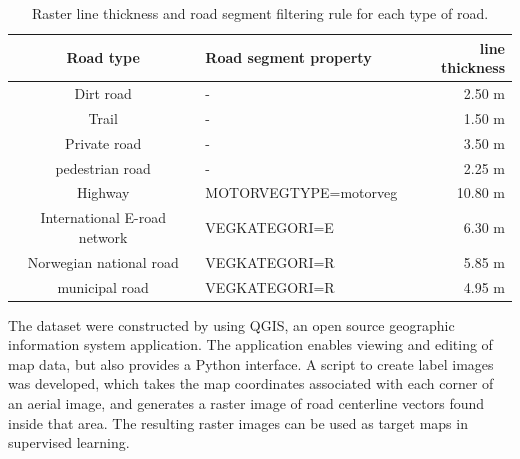 \begin{table}[htp]
\caption{Raster line thickness and road segment filtering rule for each type of road. }
\begin{center}
\begin{adjustbox}{max width=\textwidth}
\begin{tabular}{|c|l|r|}\hline
 		 Road type & Road segment property & line thickness\\\hline
 		 Dirt road & - & 2.50 m\\\hline
 		 Trail & - & 1.50 m\\\hline
 		 Private road & - & 3.50 m\\\hline
 		 pedestrian road & - & 2.25 m\\\hline
 		 Highway & MOTORVEGTYPE=motorveg & 10.80 m\\\hline
 		 International E-road network & VEGKATEGORI=E & 6.30 m\\\hline
 		 Norwegian national road & VEGKATEGORI=R & 5.85 m\\\hline
 		 municipal road & VEGKATEGORI=R & 4.95 m\\\hline
\end{tabular}
\end{adjustbox}
\end{center}
\label{tab:road_rules}
\end{table}

The dataset were constructed by using QGIS, an open source geographic information system application. The application enables viewing and editing of map data, but also provides a Python interface. A script to create label images was developed, which takes the map coordinates associated with each corner of an aerial image, and generates a raster image of road centerline vectors found inside that area. The resulting raster images can be used as target maps in supervised learning. \\

